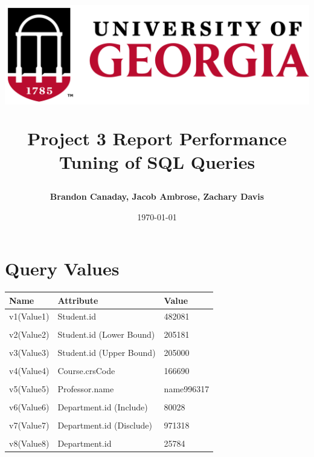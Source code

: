 \documentclass[11pt]{report}
\title{
	\begin{center}
		\includegraphics[scale=0.5]{uga.PNG}\\
 	\end{center}
 	Project 3 Report
\bigbreak Performance Tuning of SQL Queries
}
\author{\textbf{Brandon Canaday, Jacob Ambrose, Zachary Davis}}
\date{\today}
\begin{document}
\maketitle

\section*{Query Values}
	\begin{tabular}{l|l|l}
		\textbf{Name} & \textbf{Attribute} & \textbf{Value}\\
		\hline
		v1(Value1) & Student.id & 482081\\
		&&\\
		v2(Value2) & Student.id (Lower Bound) & 205181\\
		&&\\
		v3(Value3) & Student.id (Upper Bound) & 205000\\
		&&\\
		v4(Value4) & Course.crsCode & 166690\\
		&&\\
		v5(Value5) & Professor.name & name996317\\
		&&\\
		v6(Value6) & Department.id (Include) & 80028\\
		&&\\
		v7(Value7) & Department.id (Disclude) & 971318\\
		&&\\
		v8(Value8) & Department.id & 25784\\ 
	\end{tabular}
\end{document}
